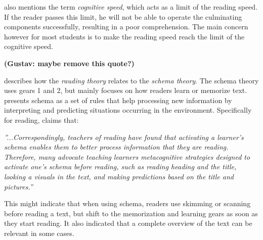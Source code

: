\citeauthor{carver_reading_1992} also mentions the term \textit{cognitive speed}, which acts as a limit of the reading speed. If the reader passes this limit, he will not be able to operate the culminating components successfully, resulting in a poor comprehension. The main concern however for most students is to make the reading speed reach the limit of the cognitive speed.

\textbf{(Gustav: maybe remove this quote?)}

\citeauthor{carver_reading_1992} describes how the \textit{rauding theory} relates to the \textit{schema theory}. The schema theory uses gears 1 and 2, but mainly focuses on how readers learn or memorize text.  presents schema as a set of rules that help processing new information by interpreting and predicting situations occurring in the environment. Specifically for reading, \citeauthor{widmayer_schema_2005} claims that:

 \emph{''...Correspondingly, teachers of reading have found that activating a learner's schema enables them to better process information that they are reading. Therefore, many advocate teaching learners metacognitive strategies designed to activate one's schema before reading, such as reading heading and the title, looking a visuals in the text, and making predictions based on the title and pictures.''}

This might indicate that when using schema, readers use skimming or scanning before reading a text, but shift to the memorization and learning gears as soon as they start reading. It also indicated that a complete overview of the text can be relevant in some cases.


